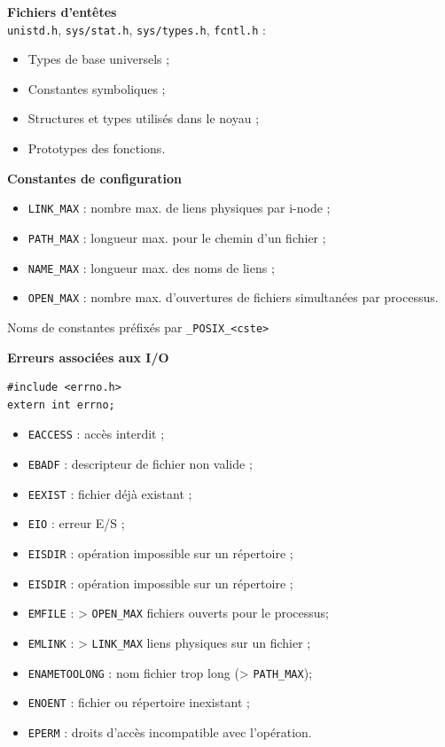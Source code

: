 \documentclass[french]{scrartcl}
\begin{document}
\begin{multicols}{3}
\clearpage
{}
\textbf{Fichiers d'entêtes}\\
\lstinline!unistd.h!, \lstinline!sys/stat.h!, \lstinline!sys/types.h!, \lstinline!fcntl.h! :\begin{itemize}
	\item Types de base universels ;
	\item Constantes symboliques ;
	\item Structures et types utilisés dans le noyau ;
	\item Prototypes des fonctions.
\end{itemize}

\vskip 5pt 
\textbf{Constantes de configuration}\begin{itemize}
	\item \lstinline!LINK_MAX! : nombre max. de liens physiques par i-node ;
	\item \lstinline!PATH_MAX! : longueur max. pour le chemin d'un fichier ;
	\item \lstinline!NAME_MAX! : longueur max. des noms de liens ;
	\item \lstinline!OPEN_MAX! : nombre max. d'ouvertures de fichiers simultanées par processus.
\end{itemize}
Noms de constantes préfixés par \lstinline!_POSIX_<cste>!

\vskip 5pt 
\textbf{Erreurs associées aux I/O}
\vspace{-7pt}\begin{lstlisting}
#include <errno.h>
extern int errno;	
\end{lstlisting}\vspace{-6pt}
\begin{itemize}
	\item \lstinline!EACCESS! : accès interdit ;
	\item \lstinline!EBADF! : descripteur de fichier non valide ;
	\item \lstinline!EEXIST! : fichier déjà existant ;
	\item \lstinline!EIO! : erreur E/S ;
	\item \lstinline!EISDIR! : opération impossible sur un répertoire ;
	\item \lstinline!EISDIR! : opération impossible sur un répertoire ;
	\item \lstinline!EMFILE! : > \lstinline!OPEN_MAX! fichiers ouverts pour le processus;
	\item \lstinline!EMLINK! : > \lstinline!LINK_MAX! liens physiques sur un fichier ;
	\item \lstinline!ENAMETOOLONG! : nom fichier trop long (> \lstinline!PATH_MAX!);
	\item \lstinline!ENOENT! : fichier ou répertoire inexistant ;
	\item \lstinline!EPERM! : droits d'accès incompatible avec l'opération.
\end{itemize}


\end{multicols}
\end{document}
